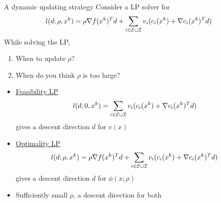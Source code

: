 \documentclass[8pt]{beamer}
\begin{document}
	\begin{frame}{A dynamic updating strategy}
		Consider a LP solver for 
		\[
		l(d; \rho, x^k) = \rho \nabla f(x^k)^Td + \sum_{i\in{\cal E}\cup{\cal I}} v_i( c_i(x^k) + \nabla c_i(x^k)^Td)
		\]
		While solving the LP,
		\begin{enumerate}
			\item {\color{blue} When} to update $\rho$?
			\item {\color{blue} When} do you think $\rho$ is too large?
		\end{enumerate}
		\vfill
		\begin{itemize}
			\item \underline{Feasibility LP }
			\[
			l(d; 0, x^k) = \sum_{i\in{\cal E}\cup{\cal I}} v_i( c_i(x^k) + \nabla c_i(x^k)^Td)
			\]
			gives a descent direction $d$ for $v(x)$
			\vfill
			\item \underline{Optimality LP}
			\[
			l(d; \rho, x^k) = \rho \nabla f(x^k)^Td + \sum_{i\in{\cal E}\cup{\cal I}} v_i( c_i(x^k) + \nabla c_i(x^k)^Td)
			\]
			gives a descent direction $d$ for $\phi(x;\rho)$
			\vfill
			\item Sufficiently small $\rho$, a descent direction for {\red  both}
		\end{itemize}
	\end{frame}
\end{document}
